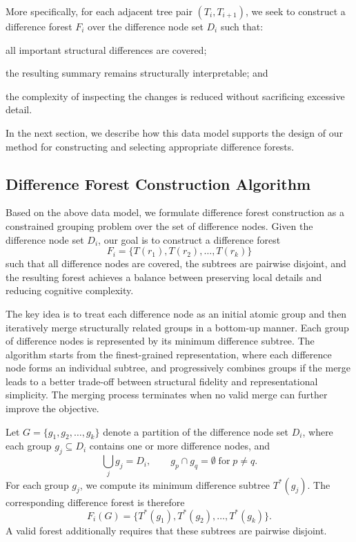 More specifically, for each adjacent tree pair $(T_i, T_{i+1})$, we seek to construct a difference forest $F_i$ over the difference node set $D_i$ such that:
\squishlist
\item all important structural differences are covered;
\item the resulting summary remains structurally interpretable; and
\item the complexity of inspecting the changes is reduced without sacrificing excessive detail.
\squishend

In the next section, we describe how this data model supports the design of our method for constructing and selecting appropriate difference forests.

\subsection{Difference Forest Construction Algorithm}

Based on the above data model, we formulate difference forest construction as a constrained grouping problem over the set of difference nodes. Given the difference node set $D_i$, our goal is to construct a difference forest
\[
F_i = \{T(r_1), T(r_2), \dots, T(r_k)\}
\]
such that all difference nodes are covered, the subtrees are pairwise disjoint, and the resulting forest achieves a balance between preserving local details and reducing cognitive complexity.

The key idea is to treat each difference node as an initial atomic group and then iteratively merge structurally related groups in a bottom-up manner. Each group of difference nodes is represented by its minimum difference subtree. The algorithm starts from the finest-grained representation, where each difference node forms an individual subtree, and progressively combines groups if the merge leads to a better trade-off between structural fidelity and representational simplicity. The merging process terminates when no valid merge can further improve the objective.

Let $G = \{g_1, g_2, \dots, g_k\}$ denote a partition of the difference node set $D_i$, where each group $g_j \subseteq D_i$ contains one or more difference nodes, and
\[
\bigcup_j g_j = D_i, \qquad g_p \cap g_q = \emptyset \; \mbox{for} \; p \neq q.
\]
For each group $g_j$, we compute its minimum difference subtree $T^*(g_j)$. The corresponding difference forest is therefore
\[
F_i(G) = \{T^*(g_1), T^*(g_2), \dots, T^*(g_k)\}.
\]
A valid forest additionally requires that these subtrees are pairwise disjoint.

